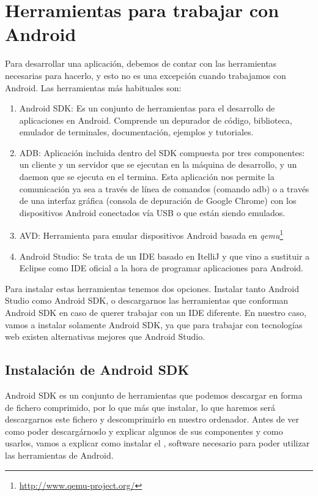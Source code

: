 \chapter{Herramientas para trabajar con Android} \label{ch:androidTools}

Para desarrollar una aplicación, debemos de contar con las herramientas necesarias para hacerlo, y esto no es una excepción cuando trabajamos con Android. Las herramientas más habituales son:

\begin{enumerate}
  \item Android \acrfull{SDK}: Es un conjunto de herramientas para el desarrollo de aplicaciones en Android. Comprende un depurador de código, biblioteca, emulador de terminales, documentación, ejemplos y tutoriales.
  \item \acrfull{ADB}: Aplicación incluida dentro del \gls{SDK} compuesta por tres componentes: un cliente y un servidor que se ejecutan en la máquina de desarrollo, y un daemon que se ejecuta en el termina. Esta aplicación nos permite la comunicación ya sea a través de línea de comandos (comando adb) o a través de una interfaz gráfica (consola de depuración de Google Chrome) con los dispositivos Android conectados vía \gls{USB} o que están siendo emulados.
  \item \acrfull{AVD}: Herramienta para emular dispositivos Android basada en \emph{qemu}\footnote{\url{http://www.qemu-project.org/}}
  \item Android Studio: Se trata de un \gls{IDE} basado en ItelliJ y que vino a sustituir a Eclipse como \gls{IDE} oficial a la hora de programar aplicaciones para Android.
\end{enumerate}

Para instalar estas herramientas tenemos dos opciones. Instalar tanto Android Studio como Android SDK, o descargarnos las herramientas que conforman Android SDK en caso de querer trabajar con un IDE diferente. En nuestro caso, vamos a instalar solamente Android SDK, ya que para trabajar con tecnologías web existen alternativas mejores que Android Studio.

\section{Instalación de Android SDK}

Android SDK es un conjunto de herramientas que podemos descargar en forma de fichero comprimido, por lo que más que instalar, lo que haremos será descargarnos este fichero y descomprimirlo en nuestro ordenador. Antes de ver como poder descargárnoslo y explicar algunos de sus componentes y como usarlos, vamos a explicar como instalar el , software necesario para poder utilizar las herramientas de Android.


